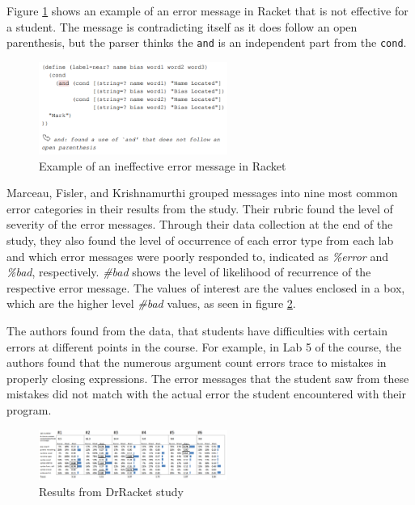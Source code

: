 \documentclass{sig-alternate}
\begin{document}
Figure \ref{fig:racketerrormessage} shows an example of an error message in Racket that is not effective for a student. The message is contradicting itself as it does follow an open parenthesis, but the parser thinks the \texttt{and} is an independent part from the \texttt{cond}.

\begin{figure}[t!]
  \centering
  \includegraphics[keepaspectratio, width=0.55\textwidth]{MEE_example.png}
  \caption{Example of an ineffective error message in Racket}
  \label{fig:racketerrormessage}
\end{figure}

Marceau, Fisler, and Krishnamurthi grouped messages into nine most common error categories in their results from the study. Their rubric found the level of severity of the error messages. Through their data collection at the end of the study, they also found the level of occurrence of each error type from each lab and which error messages were poorly responded to, indicated as \textit{\%error} and \textit{\%bad}, respectively. \textit{\#bad} shows the level of likelihood of recurrence of the respective error message. The values of interest are the values enclosed in a box, which are the higher level \textit{\#bad} values, as seen in figure \ref{fig:drracketstudy}. 

The authors found from the data, that students have difficulties with certain errors at different points in the course. For example, in Lab 5 of the course, the authors found that the numerous argument count errors trace to mistakes in properly closing expressions. The error messages that the student saw from these mistakes did not match with the actual error the student encountered with their program. 


\begin{figure}[t!]
  \centering
  \includegraphics[keepaspectratio, width=0.55\textwidth]{MEE_Data.png}
  \caption{Results from DrRacket study}
  \label{fig:drracketstudy}
\end{figure}
\end{document}
